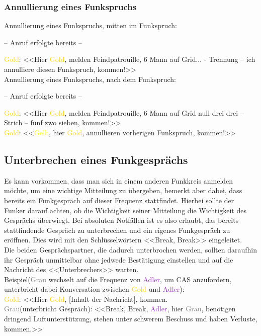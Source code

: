 \subsubsection{Annullierung eines Funkspruchs}
	Annullierung eines Funkspruchs, mitten im Funkspruch: \\
		\begin{center}
		– Anruf erfolgte bereits –
		\end{center}
	\textcolor{gold}{Gold}: <<Hier \textcolor{gold}{Gold}, melden Feindpatrouille, 6 Mann auf Grid... - Trennung – ich annulliere diesen Funkspruch, kommen!>> \\
	Annullierung eines Funkspruchs, nach dem Funkspruch: \\
		\begin{center}
		– Anruf erfolgte bereits – \\
		\end{center}
	\textcolor{gold}{Gold}: <<Hier \textcolor{gold}{Gold}, melden Feindpatrouille, 6 Mann auf Grid null drei drei – Strich – fünf zwo sieben, kommen!>> \\
	\textcolor{gold}{Gold}: <<\textcolor{yellow}{Gelb}, hier \textcolor{gold}{Gold}, annullieren vorherigen Funkspruch, kommen!>> \\

\subsection{Unterbrechen eines Funkgesprächs}
	Es kann vorkommen, dass man sich in einem anderen Funkkreis anmelden möchte, um eine wichtige Mitteilung zu übergeben, bemerkt aber dabei, dass bereits ein Funkgespräch auf dieser Frequenz stattfindet. Hierbei sollte der Funker darauf achten, ob die Wichtigkeit seiner Mitteilung die Wichtigkeit des Gesprächs überwiegt. Bei absoluten Notfällen ist es also erlaubt, das bereits stattfindende Gespräch zu unterbrechen und ein eigenes Funkgespräch zu eröffnen. Dies wird mit den Schlüsselwörtern <<Break, Break>> eingeleitet. \\
	Die beiden Gesprächspartner, die dadurch unterbrochen werden, sollten daraufhin ihr Gespräch unmittelbar ohne jedwede Bestätigung einstellen und auf die Nachricht des <<Unterbrechers>> warten. \\
	Beispiel(\textcolor{gray}{Grau} wechselt auf die Frequenz von \textcolor{DarkOrchid}{Adler}, um CAS anzufordern, unterbricht dabei Konversation zwischen \textcolor{gold}{Gold} und \textcolor{DarkOrchid}{Adler}):\\
	\textcolor{gold}{Gold}: <<Hier \textcolor{gold}{Gold}, [Inhalt der Nachricht], kommen. \\
	\textcolor{gray}{Grau}(unterbricht Gespräch): <<Break, Break, \textcolor{DarkOrchid}{Adler}, hier \textcolor{gray}{Grau}, benötigen dringend Luftunterstützung, stehen unter schwerem Beschuss und haben Verluste, kommen.>>  \\

